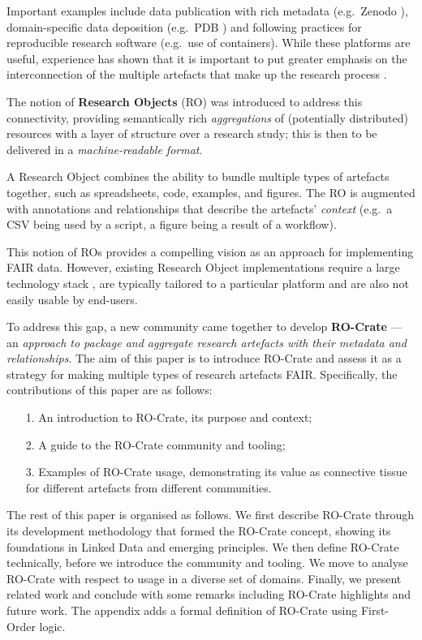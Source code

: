 Important examples include data publication with rich metadata
(e.g.~Zenodo \cite{Dillen 2019}),
domain-specific data deposition (e.g.~PDB
\cite{Berman 2007}) and following
practices for reproducible research software
\cite{ch5-101} (e.g.~use
of containers). While these platforms are useful, experience has shown
that it is important to put greater emphasis on the interconnection of
the multiple artefacts that make up the research process
\cite{ch5-71}.

The notion of \textbf{Research Objects}
\cite{ch5-12}
(RO) was introduced to address this connectivity, providing semantically
rich \emph{aggregations} of (potentially distributed) resources with a
layer of structure over a research study; this is then to be delivered
in a \emph{machine-readable format}.

A Research Object combines the ability to bundle multiple types of
artefacts together, such as spreadsheets, code, examples, and figures.
The RO is augmented with annotations and relationships that describe the
artefacts' \emph{context} (e.g.~a CSV being used by a script, a figure
being a result of a workflow).

This notion of ROs provides a compelling vision as an approach for
implementing FAIR data. However, existing Research Object
implementations require a large technology stack
\cite{Belhajjame 2015}, are
typically tailored to a particular platform and are also not easily
usable by end-users.

To address this gap, a new community came together
\cite{OCarragain 2019} to develop
\textbf{RO-Crate} --- an \emph{approach to package and aggregate
research artefacts with their metadata and relationships}. The aim of
this paper is to introduce RO-Crate and assess it as a strategy for
making multiple types of research artefacts FAIR. Specifically, the
contributions of this paper are as follows:

\begin{enumerate}
  \item[1.] An introduction to RO-Crate, its purpose and context;
  \item[2.] A guide to the RO-Crate community and tooling;
  \item[3.] Examples of RO-Crate usage, demonstrating its value as connective tissue for different artefacts from different communities.
\end{enumerate}

The rest of this paper is organised as follows. We first describe
RO-Crate through its development methodology that formed the RO-Crate
concept, showing its foundations in Linked Data and emerging principles.
We then define RO-Crate technically, before we introduce the community
and tooling. We move to analyse RO-Crate with respect to usage in a
diverse set of domains. Finally, we present related work and conclude
with some remarks including RO-Crate highlights and future work. The
appendix adds a formal definition of RO-Crate using First-Order logic.

